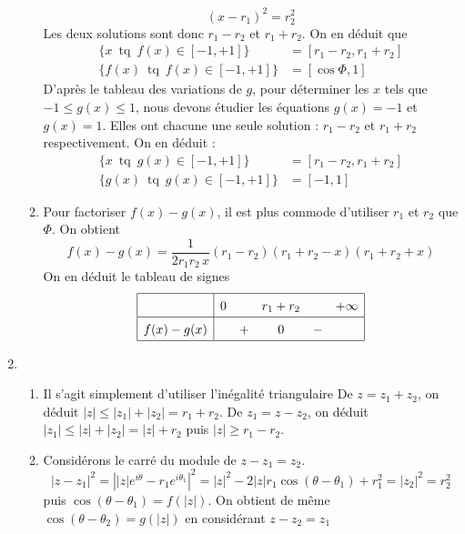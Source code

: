 \begin{enumerate}
\begin{enumerate}
\[
 (x-r_1)^2 = r_2^2
\]
Les deux solutions sont donc $r_1-r_2$ et $r_1+r_2$. On en déduit que 
\begin{align*}
\{x \,\text{ tq }\, f(x)\in [-1,+1]\} &= [r_1-r_2,r_1+r_2] \\
\{f(x) \,\text{ tq }\, f(x)\in [-1,+1]\} &= [\cos \Phi,1]
\end{align*}
D'après le tableau des variations de $g$, pour déterminer les $x$ tels que $-1 \leq g(x) \leq 1$, nous devons étudier les équations $g(x)=-1$ et $g(x)=1$. Elles ont chacune une seule solution : $r_1-r_2$ et $r_1+r_2$ respectivement. On en déduit :
\begin{align*}
\{x \,\text{ tq }\, g(x)\in [-1,+1]\} &= [r_1-r_2,r_1+r_2] \\
\{g(x) \,\text{ tq }\, g(x)\in [-1,+1]\} &= [-1,1]
\end{align*}
\item Pour factoriser $f(x)-g(x)$, il est plus commode d'utiliser $r_1$ et $r_2$ que $\Phi$. On obtient
\[
f(x)-g(x) =\frac{1}{2r_1r_2\,x}(r_1-r_2)(r_1+r_2-x)(r_1+r_2+x)
\]
On en déduit le tableau de signes
\begin{displaymath}
\renewcommand{\arraystretch}{1.5}
\begin{array}{|c|ccccc|} \hline
 & 0 &  & r_1+r_2 &  & +\infty \\ 
\hline f(x)-g(x) &  & + & 0 & - &\\ \hline 
\end{array} 
\end{displaymath}

\end{enumerate}
\item \begin{enumerate}
\item Il s'agit simplement d'utiliser l'inégalité triangulaire De $z=z_1+z_2$, on déduit $|z|\leq |z_1|+|z_2|=r_1+r_2$. De $z_1=z-z_2$, on déduit $|z_1|\leq |z|+|z_2|=|z|+r_2$ puis $|z|\geq r_1-r_2$.

\item Considérons le carré du module de $z-z_1 = z_2$.
\[
|z-z_1|^2 = \left||z|e^{i\theta} - r_1e^{i\theta_1}\right|^2 
= |z|^2-2|z|r_1\cos(\theta - \theta_1)+r_1^2 = |z_2|^2 = r_2^2
\]
puis $\cos(\theta - \theta_1)=f(|z|)$.\newline
On obtient de même $\cos(\theta - \theta_2)=g(|z|)$ en considérant $z-z_2=z_1$ 
\end{enumerate}


\end{enumerate}
